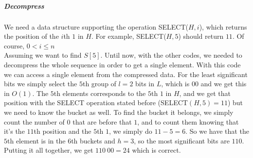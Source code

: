 \documentclass[10pt]{report}
\begin{document}
\subparagraph{Decompress}
We need a data structure supporting the operation SELECT($H, i$), which returns the position of the $i$th $1$ in $H$. For example, SELECT($H, 5$) should return $11$. Of course, $0< i \leq n$\\
Assuming we want to find $S[5]$. Until now, with the other codes, we needed to decompress the whole sequence in order to get a single element. With this code we can access a single element from the compressed data. For the least significant bits we simply select the $5$th group of $l=2$ bits in $L$, which is $00$ and we get this in $O(1)$. The $5$th elements corresponds to the $5$th $1$ in $H$, and we get that position with the SELECT operation stated before (SELECT$(H,5)= 11$) but we need to know the bucket as well. To find the bucket it belongs, we simply count the number of $0$ that are before that $1$, and to count them knowing that it's the $11$th position and the $5$th $1$, we simply do $11-5=6$. So we have that the $5$th element is in the $6$th buckets and $h=3$, so the most significant bits are $110$. Putting it all together, we get $110\:00 = 24$ which is correct.
\end{document}
